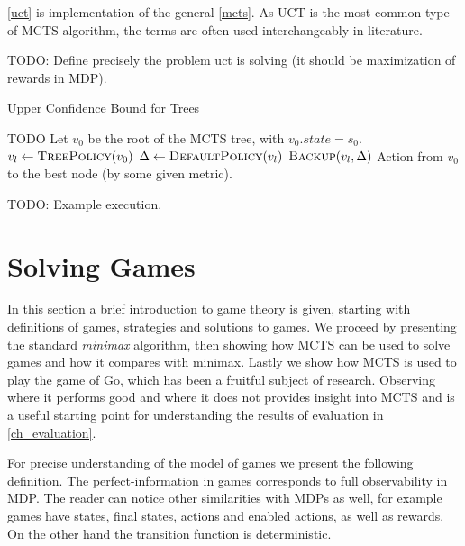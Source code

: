 \autoref{uct} is implementation of the general \autoref{mcts}. As UCT is
the most common type of MCTS algorithm, the terms are often used
interchangeably in literature.

TODO: Define precisely the problem uct is solving (it should be
maximization of rewards in MDP).

\begin{algorithm}
    \caption{Upper Confidence Bound for Trees}
\label{uct}
\begin{algorithmic}
    \State TODO
    \State Let $v_0$ be the root of the MCTS tree, with $v_0.state = s_0$.
        \State $v_l \gets \Call{TreePolicy}{v_0}$
        \State $\Delta \gets \Call{DefaultPolicy}{v_l}$
        \State $\Call{Backup}{v_l, \Delta}$
    \EndWhile
    \State \Return Action from $v_0$ to the best node (by some
    given metric).
\EndFunction
\end{algorithmic}
\end{algorithm}


TODO: Example execution.

\section{Solving Games}

In this section a brief introduction to game theory is given, starting
with definitions of games, strategies and solutions to games. We
proceed by presenting the standard {\em minimax} algorithm, then showing
how MCTS can be used to solve games and how it compares with minimax.
Lastly we show how MCTS is used to play the game of Go, which has been a
fruitful subject of research.
Observing where it performs good and where it does not provides insight
into MCTS and is a useful starting point for understanding the results
of evaluation in \autoref{ch_evaluation}.

For precise understanding of the model of games we present the following
definition.
The perfect-information in games corresponds to
full observability in MDP.  The reader can notice other similarities
with MDPs as well, for example games have states, final states, actions
and enabled actions, as well as rewards. On the other hand the
transition function is deterministic.

